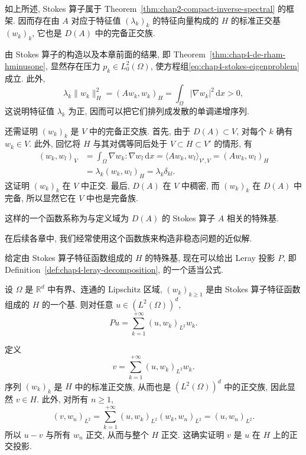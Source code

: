 \begin{Proof}
如上所述, Stokes 算子属于 Theorem~\ref{thm:chap2-compact-inverse-spectral} 的框架. 因而存在由 $A$ 对应于特征值 $(\lambda_k)_k$ 的特征向量构成的 $H$ 的标准正交基 $(w_k)_k$, 它也是 $D(A)$ 中的完备正交族.

由 Stokes 算子的构造以及本章前面的结果, 即 Theorem~\ref{thm:chap4-de-rham-hminusone}, 显然存在压力 $p_k\in L_0^2(\Omega)$, 使方程组\eqref{eq:chap4-stokes-eigenproblem}成立. 此外,
\[
 \lambda_k\|w_k\|_H^2=(Aw_k,w_k)_H
 =\int_\Omega|\nabla w_k|^2\,\mathrm dx>0,
\]
这说明特征值 $\lambda_k$ 为正, 因而可以把它们排列成发散的单调递增序列.

还需证明 $(w_k)_k$ 是 $V$ 中的完备正交族. 首先, 由于 $D(A)\subset V$, 对每个 $k$ 确有 $w_k\in V$. 此外, 回忆将 $H$ 与其对偶等同后处于 $V\subset H\subset V'$ 的情形, 有
\[
 \begin{aligned}
  (w_k,w_l)_V
  &=\int_\Omega\nabla w_k:\nabla w_l\,\mathrm dx
   =\langle Aw_k,w_l\rangle_{V',V}
   =(Aw_k,w_l)_H\\
  &=\lambda_k(w_k,w_l)_H=\lambda_k\delta_{kl}.
 \end{aligned}
\]
这证明 $(w_k)_k$ 在 $V$ 中正交. 最后, $D(A)$ 在 $V$ 中稠密, 而 $(w_k)_k$ 在 $D(A)$ 中完备, 所以显然它在 $V$ 中也是完备族.
\end{Proof}

\begin{Definition}
\label{def:chap4-stokes-special-basis}
这样的一个函数系称为与定义域为 $D(A)$ 的 Stokes 算子 $A$ 相关的特殊基.
\end{Definition}

在后续各章中, 我们经常使用这个函数族来构造非稳态问题的近似解.

给定由 Stokes 算子特征函数组成的 $H$ 的特殊基, 现在可以给出 Leray 投影 $P$, 即 Definition~\ref{def:chap4-leray-decomposition}, 的一个适当公式.

\begin{Lemma}
\label{lem:chap4-leray-projection-special-basis}
设 $\Omega$ 是 $\mathbb R^d$ 中有界、连通的 Lipschitz 区域, $(w_k)_{k\geq1}$ 是由 Stokes 算子特征函数组成的 $H$ 的一个基. 则对任意 $u\in(L^2(\Omega))^d$,
\[
 Pu=\sum_{k=1}^{+\infty}(u,w_k)_{L^2}w_k.
\]
\end{Lemma}

\begin{Proof}
定义
\[
 v=\sum_{k=1}^{+\infty}(u,w_k)_{L^2}w_k.
\]
序列 $(w_k)_k$ 是 $H$ 中的标准正交族, 从而也是 $(L^2(\Omega))^d$ 中的正交族, 因此显然 $v\in H$. 此外, 对所有 $n\geq1$,
\[
 (v,w_n)_{L^2}
 =\sum_{k=1}^{+\infty}(u,w_k)_{L^2}(w_k,w_n)_{L^2}
 =(u,w_n)_{L^2}.
\]
所以 $u-v$ 与所有 $w_n$ 正交, 从而与整个 $H$ 正交. 这确实证明 $v$ 是 $u$ 在 $H$ 上的正交投影.
\end{Proof}

